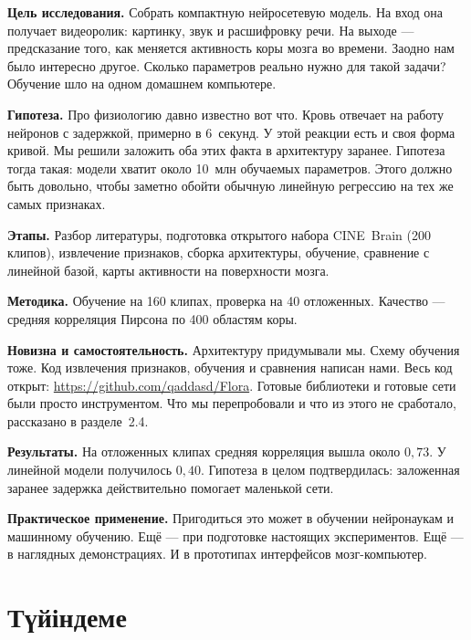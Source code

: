 \documentclass[12pt,a4paper]{article}
\begin{document}
\textbf{Цель исследования.} Собрать компактную нейросетевую модель.
На вход она получает видеоролик: картинку, звук и расшифровку речи.
На выходе — предсказание того, как меняется активность коры мозга во
времени. Заодно нам было интересно другое. Сколько параметров реально
нужно для такой задачи? Обучение шло на одном домашнем компьютере.

\textbf{Гипотеза.} Про физиологию давно известно вот что. Кровь
отвечает на работу нейронов с задержкой, примерно в 6~секунд. У этой
реакции есть и своя форма кривой. Мы решили заложить оба этих факта в
архитектуру заранее. Гипотеза тогда такая: модели хватит около
10~млн обучаемых параметров. Этого должно быть довольно, чтобы заметно
обойти обычную линейную регрессию на тех же самых признаках.

\textbf{Этапы.} Разбор литературы, подготовка открытого набора
CINE~Brain (200 клипов), извлечение признаков, сборка архитектуры,
обучение, сравнение с линейной базой, карты активности на поверхности
мозга.

\textbf{Методика.} Обучение на 160 клипах, проверка на 40 отложенных.
Качество — средняя корреляция Пирсона по 400 областям коры.

\textbf{Новизна и самостоятельность.} Архитектуру придумывали мы.
Схему обучения тоже. Код извлечения признаков, обучения и сравнения
написан нами. Весь код открыт:
\url{https://github.com/qaddasd/Flora}. Готовые библиотеки и готовые
сети были просто инструментом. Что мы перепробовали и что из этого не
сработало, рассказано в разделе~2.4.

\textbf{Результаты.} На отложенных клипах средняя корреляция вышла
около $0{,}73$. У линейной модели получилось $0{,}40$. Гипотеза в целом
подтвердилась: заложенная заранее задержка действительно помогает
маленькой сети.

\textbf{Практическое применение.} Пригодиться это может в обучении
нейронаукам и машинному обучению. Ещё — при подготовке настоящих
экспериментов. Ещё — в наглядных демонстрациях. И в прототипах
интерфейсов мозг-компьютер.

\section*{Түйіндеме}
\end{document}
